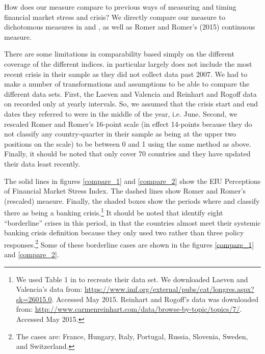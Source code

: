 \documentclass[]{article}
\begin{document}
How does our measure compare to previous ways of measuring and timing
financial market stress and crisis? We directly compare our measure to
dichotomous measures in \cite{Reinhart2009} and \cite{laeven2013}, as well as Romer and Romer's (2015) continuous measure.

There are some limitations in comparability based simply on the
different coverage of the different indices. \cite{Romer2015}
in particular largely does not include the most recent crisis in their
sample as they did not collect data past 2007. We had to make a number
of transformations and assumptions to be able to compare the different
data sets. First, the Laeven and Valencia and Reinhart and Rogoff data
on recorded only at yearly intervals. So, we assumed that the crisis
start and end dates they referred to were in the middle of the year,
i.e. June. Second, we rescaled Romer and Romer's 16-point scale (in effect 14-points because they do not classify any country-quarter in
their sample as being at the upper two positions on the scale) to be
between 0 and 1 using the same method as above. Finally, it should be
noted that \cite{Reinhart2009} only cover 70 countries and they
have updated their data least recently.

The solid lines in figures \ref{compare_1} and \ref{compare_2} show the
EIU Perceptions of Financial Market Stress Index. The dashed lines show
Romer and Romer's (rescaled) measure. Finally, the shaded boxes show the
periods where \cite{laeven2013} and \cite{Reinhart2009} classify there as being a banking crisis.\footnote{We used Table 1 in \cite{Romer2015} to recreate their data set. We downloaded Laeven and Valencia's data from: \url{https://www.imf.org/external/pubs/cat/longres.aspx?sk=26015.0}.
  Accessed May 2015. Reinhart and Rogoff's data was downloaded from:
  \url{http://www.carmenreinhart.com/data/browse-by-topic/topics/7/}.
  Accessed May 2015.} It should be noted that \cite{laeven2013} identify eight ``borderline'' crises in this period, in that the countries almost meet their systemic banking crisis definition because they only used two rather than three policy responses.\footnote{The cases are: France, Hungary, Italy, Portugal, Russia, Slovenia, Sweden, and Switzerland.} Some of these borderline cases are shown in the figures \ref{compare_1} and \ref{compare_2}.
\end{document}
